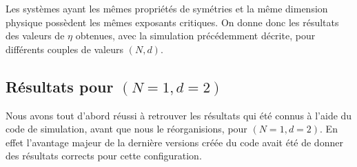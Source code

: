 \documentclass[10.5pt]{article}
\begin{document}
\begin{multicols*}{2}
\label{sec:ResContinu}

Les systèmes ayant les mêmes propriétés de symétries et la même dimension physique possèdent les mêmes exposants critiques. On donne donc les résultats des valeurs de $\eta$ obtenues, avec la simulation précédemment décrite, pour différents couples de valeurs $(N,d)$.


\subsection{Résultats pour $(N = 1, d=2)$}

Nous avons tout d'abord réussi à retrouver les résultats qui été connus à l'aide du code de simulation, avant que nous le réorganisions, pour $(N=1, d=2)$. En effet l'avantage majeur de la dernière versions créée du code avait été de donner des résultats corrects pour cette configuration.


\end{multicols*}
\end{document}
